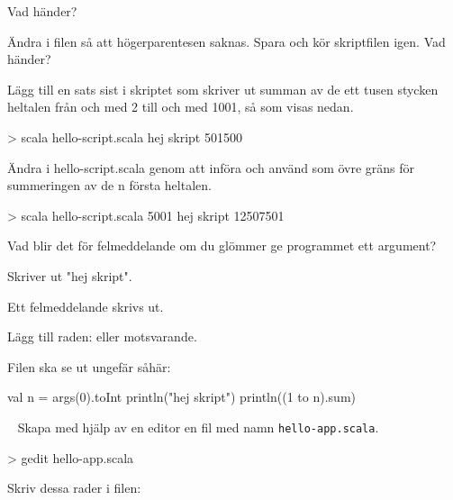 \Subtask Vad händer?

\Subtask Ändra i filen så att högerparentesen saknas. Spara och kör skriptfilen igen. Vad händer?

\Subtask Lägg till en sats sist i skriptet som skriver ut summan av de ett tusen stycken heltalen från och med 2 till och med 1001, så som visas nedan.
\begin{REPL}
> scala hello-script.scala
hej skript
501500
\end{REPL}

\Subtask Ändra i hello-script.scala genom att införa  och använd  som övre gräns för summeringen av de n första heltalen.
\begin{REPL}
> scala hello-script.scala 5001
hej skript
12507501
\end{REPL}

\Subtask Vad blir det för felmeddelande om du glömmer ge programmet ett argument?


\SOLUTION


\TaskSolved \what
 

\SubtaskSolved  Skriver ut "hej skript".

\SubtaskSolved  Ett felmeddelande skrivs ut.

\SubtaskSolved  Lägg till raden:
eller motsvarande.

\SubtaskSolved  Filen ska se ut ungefär såhär: \\
\begin{Code} 
val n = args(0).toInt 
println("hej skript") 
println((1 to n).sum)
\end{Code}

\SubtaskSolved  {}



\QUESTEND









\QUESTBEGIN

\Task  \what~  Skapa med hjälp av en editor en fil med namn \texttt{hello-app.scala}.
\begin{REPLnonum}
> gedit hello-app.scala
\end{REPLnonum}
Skriv dessa rader i filen:



